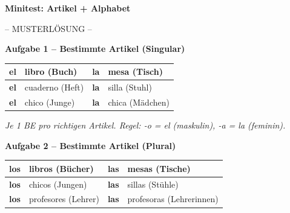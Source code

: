 \documentclass[11pt, a4paper]{article}
\newcommand{\punktebox}[1]{\hfill\fbox{\small \_\_\_/#1}}
\newcommand{\lsg}[1]{\textcolor{loesung}{\textbf{#1}}}
\begin{document}

\begin{center}
    {\Large\bfseries\textcolor{spanisch}{Minitest: Artikel + Alphabet}}

    \vspace{5pt}
    {\large\textcolor{loesung}{-- MUSTERLÖSUNG --}}
\end{center}

\vspace{10pt}


\noindent\textbf{\textcolor{spanisch}{Aufgabe 1 -- Bestimmte Artikel (Singular)}} \punktebox{6}

\vspace{10pt}

\begin{tabularx}{\textwidth}{|l|X|l|X|}
\hline
\lsg{el} & libro (Buch) & \lsg{la} & mesa (Tisch) \\
\hline
\lsg{el} & cuaderno (Heft) & \lsg{la} & silla (Stuhl) \\
\hline
\lsg{el} & chico (Junge) & \lsg{la} & chica (Mädchen) \\
\hline
\end{tabularx}

\vspace{5pt}
\textit{Je 1 BE pro richtigen Artikel. Regel: -o = el (maskulin), -a = la (feminin).}

\vspace{15pt}


\noindent\textbf{\textcolor{spanisch}{Aufgabe 2 -- Bestimmte Artikel (Plural)}} \punktebox{6}

\vspace{10pt}

\begin{tabularx}{\textwidth}{|l|X|l|X|}
\hline
\lsg{los} & libros (Bücher) & \lsg{las} & mesas (Tische) \\
\hline
\lsg{los} & chicos (Jungen) & \lsg{las} & sillas (Stühle) \\
\hline
\lsg{los} & profesores (Lehrer) & \lsg{las} & profesoras (Lehrerinnen) \\
\hline
\end{tabularx}
\end{document}
